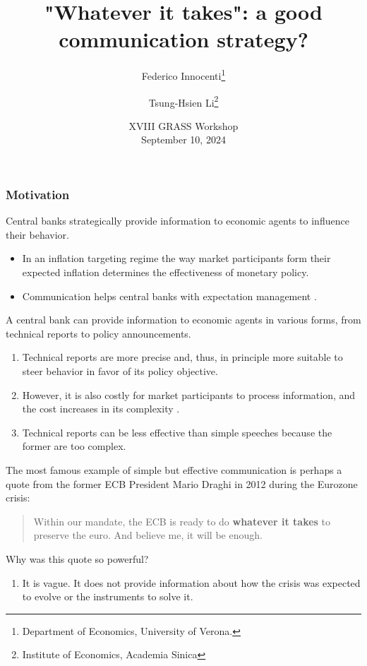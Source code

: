 \documentclass{beamer}
\begin{document}
	
\title[]{"Whatever it takes": a good communication strategy?}
	
\author{Federico Innocenti\thanks{Department of Economics, University of Verona.} \and Tsung-Hsien Li\thanks{Institute of Economics, Academia Sinica}}
\date{XVIII GRASS Workshop \\
September 10, 2024} 

\begin{frame}
	\titlepage 
\end{frame}

\begin{frame}[allowframebreaks]
\frametitle{Motivation}
Central banks strategically provide information to economic agents to influence their behavior. 
\begin{itemize}
    \item In an inflation targeting regime the way market participants form their expected inflation determines the effectiveness of monetary policy.
    \item Communication helps central banks with expectation management \citep{Casiraghi2022}.
\end{itemize}
\vskip10pt
A central bank can provide information to economic agents in various forms, from technical reports to policy announcements.
\begin{enumerate}
    \item Technical reports are more precise and, thus, in principle more suitable to steer behavior in favor of its policy objective.
    \item However, it is also costly for market participants to process information, and the cost increases in its complexity \citep{Sims2003}.
    \item Technical reports can be less effective than simple speeches because the former are too complex.
\end{enumerate} 
\framebreak
The most famous example of simple but effective communication is perhaps a quote from the former ECB President Mario Draghi in 2012 during the Eurozone crisis:
\vskip5pt
\begin{quote}
Within our mandate, the ECB is ready to do \textbf{whatever it takes} to preserve the euro. And believe me, it will be enough.
\end{quote}
\vskip5pt
Why was this quote so powerful?
\begin{enumerate}
    \item It is vague. It does not provide information about how the crisis was expected to evolve or the instruments to solve it. 

\end{enumerate}
\end{frame}
\end{document}
